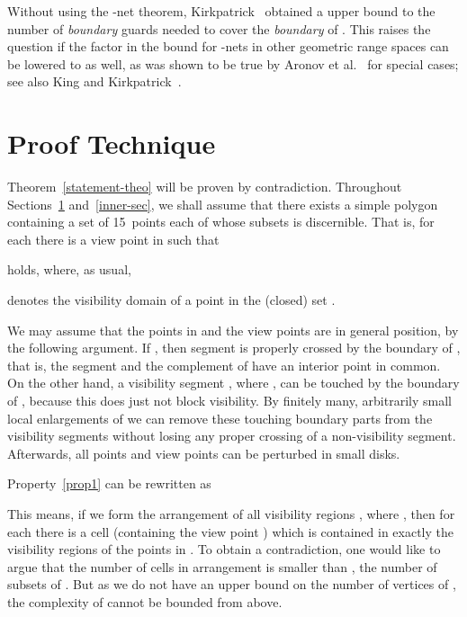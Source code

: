 \documentclass[11pt]{article}
\begin{document}
Without using the -net theorem, Kirkpatrick~\cite{k-ggnn-00} obtained a  upper
bound to the number of {\em boundary} guards needed to cover the {\em boundary} of . This raises the question 
if the factor  in the  bound for -nets in other geometric range spaces 
can be lowered to  as well, as was shown to be true by Aronov et al.~\cite{bes-ssena-10} for 
special cases; see also King and Kirkpatrick~\cite{kk-iagsgp-10}. 




\bigskip



\section{Proof Technique}         \label{technique-sec}

Theorem~\ref{statement-theo} will be proven by contradiction. 
Throughout Sections~\ref{technique-sec} and~\ref{inner-sec}, we shall assume that there exists a simple
polygon  containing a set  of 15~points each of whose subsets is discernible.
That is, for each  there is a view point  in  such that 

holds, where, as usual,
   
denotes the visibility domain of a point  in the (closed) set . 

We may assume that the points in  and the view points  are in general position,
by the following argument. If ,
then segment  is properly crossed by the boundary of , that is, the segment and the complement
of  have an interior point in common. On the other hand,
a visibility segment , where , can be touched by the boundary of , because
this does just not block visibility. By finitely many, arbitrarily small local enlargements of  we can remove
these touching boundary parts from the visibility segments without losing any proper crossing of a non-visibility segment.
Afterwards, all points and view points can be perturbed in small disks.

Property~\ref{prop1} can be rewritten as

This means, if we form the arrangement  of all visibility regions , where ,
then for each  there is a cell (containing the view point ) which is contained
in exactly the visibility regions of the points in .
To obtain a contradiction, one would like to argue that the number of cells in 
arrangement  is smaller than , the number of subsets of . But as we do not have
an upper bound on the number of vertices of ,  the complexity of  cannot be bounded from above.
\end{document}
